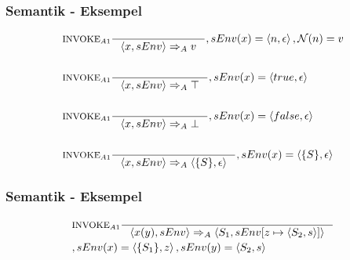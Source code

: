 \begin{frame}
	\frametitle{Semantik - Eksempel}
	\begin{align*}
	&\inference[$\text{INVOKE}_{A1}$]{}
                  {\Braket{x,sEnv} \Rightarrow_A v}
                  {,sEnv(x) = \Braket{n,\epsilon}, \mathcal{N}(n) = v}
	\\\\
	&\inference[$\text{INVOKE}_{A1}$]{}
                  {\Braket{x,sEnv} \Rightarrow_A \top}
                  {,sEnv(x) = \Braket{true,\epsilon}}
	\\\\
	&\inference[$\text{INVOKE}_{A1}$]{}
                  {\Braket{x,sEnv} \Rightarrow_A \bot}
                  {,sEnv(x) = \Braket{false,\epsilon}}
  \\\\
	&\inference[$\text{INVOKE}_{A1}$]{}
                  {\Braket{x,sEnv} \Rightarrow_A \Braket{\{S\},\epsilon}}
                  {,sEnv(x) = \Braket{\{S\},\epsilon}}
	\end{align*}
\end{frame}

\begin{frame}
	\frametitle{Semantik - Eksempel}
	\begin{align*}
	&\inference[$\text{INVOKE}_{A1}$]{}
                  {\Braket{x(y),sEnv} \Rightarrow_A \Braket{S_1,sEnv[z \mapsto \Braket{S_2,s}]}}
                  \\
					        &{,sEnv(x) = \Braket{\{S_1\},z},sEnv(y) = \Braket{S_2,s}}
	\end{align*}
\end{frame}